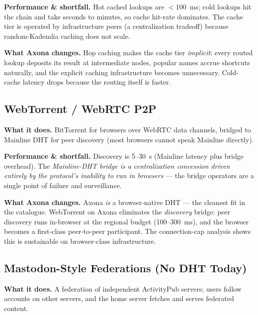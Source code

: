 \documentclass[nobib]{tufte-handout}
\begin{document}
\textbf{Performance \& shortfall.} Hot cached lookups are
$<$100~ms; cold lookups hit the chain and take seconds to minutes, so
cache hit-rate dominates. The cache tier is operated by infrastructure
peers (a centralization tradeoff) because random-Kademlia caching does
not scale.

\textbf{What Axona changes.} Hop caching makes the cache tier
\emph{implicit}: every routed lookup deposits its result at intermediate
nodes, popular names accrue shortcuts naturally, and the explicit
caching infrastructure becomes unnecessary. Cold-cache latency drops
because the routing itself is faster.

\subsection{WebTorrent / WebRTC P2P}

\textbf{What it does.} BitTorrent for browsers over WebRTC data
channels, bridged to Mainline DHT for peer discovery (most browsers
cannot speak Mainline directly).

\textbf{Performance \& shortfall.} Discovery is 5--30~s (Mainline
latency plus bridge overhead). The \emph{Mainline-DHT bridge is a
centralization concession driven entirely by the protocol's inability
to run in browsers} --- the bridge operators are a single point of
failure and surveillance.

\textbf{What Axona changes.} Axona \emph{is} a browser-native DHT ---
the cleanest fit in the catalogue. WebTorrent on Axona eliminates the
\emph{discovery} bridge: peer discovery runs in-browser at the regional
budget (100--300~ms), and the browser becomes a first-class
peer-to-peer participant. The connection-cap analysis shows this is sustainable on
browser-class infrastructure.

\subsection{Mastodon-Style Federations (No DHT Today)}

\textbf{What it does.} A federation of independent ActivityPub servers;
users follow accounts on other servers, and the home server fetches and
serves federated content.
\end{document}
